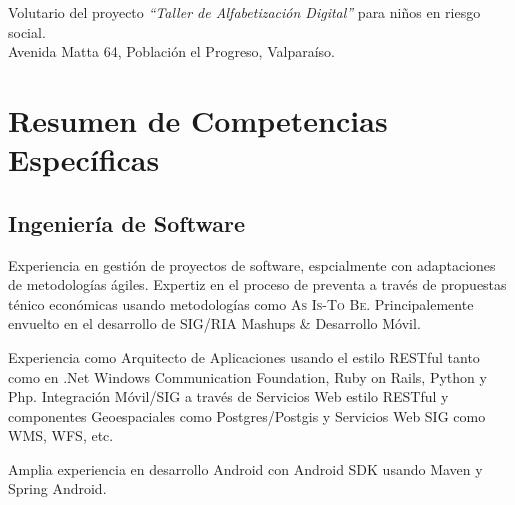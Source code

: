 \documentclass[11pt,letterpaper,roman]{moderncv}
\begin{document}
 {\tchr} {\ernestoquiroz } {\valpo} {}
{Volutario del proyecto \textit{``Taller de Alfabetizaci\'on Digital''}
para niños en riesgo social. \\ Avenida Matta 64, Población el Progreso,
Valparaíso.}
	
	
%


%	
%	
%	
%
%	
\section{Resumen de Competencias Específicas} \subsection{Ingeniería de
Software}  {Experiencia
en gestión de proyectos de software, espcialmente con adaptaciones de
metodologías ágiles. Expertiz en el proceso de preventa a través de propuestas
ténico económicas usando metodologías como \textsc{As Is-To Be}. Principalemente
envuelto en el desarrollo de SIG/RIA Mashups \& Desarrollo Móvil.}
	

 {Experiencia como Arquitecto de
Aplicaciones usando el estilo RESTful tanto como en .Net Windows Communication
Foundation, Ruby on Rails, Python y Php. Integración Móvil/SIG a través de
Servicios Web estilo RESTful y componentes Geoespaciales como Postgres/Postgis y
Servicios Web SIG como WMS, WFS, etc.}
	

 {Amplia experiencia en desarrollo Android con Android
SDK usando Maven y Spring Android.}
\end{document}
